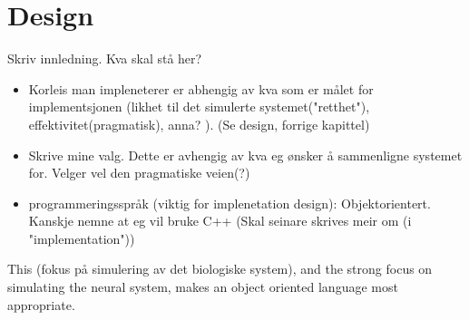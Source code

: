 \chapter{ Design }

Skriv innledning. Kva skal stå her?
\begin{itemize}
	\item Korleis man impleneterer er abhengig av kva som er målet for implementsjonen (likhet til det simulerte systemet("retthet"), effektivitet(pragmatisk), anna? ). (Se design, forrige kapittel)%
	\item Skrive mine valg. Dette er avhengig av kva eg ønsker å sammenligne systemet for. Velger vel den pragmatiske veien(?)
	\item programmeringsspråk (viktig for implenetation design): Objektorientert. Kanskje nemne at eg vil bruke C++ (Skal seinare skrives meir om (i "implementation"))
\end{itemize}

	This (fokus på simulering av det biologiske system), and the strong focus on simulating the neural system, makes an object oriented language most appropriate. 



